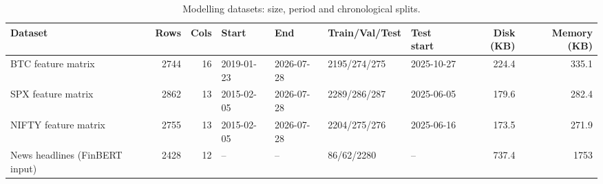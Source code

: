 \begin{table}[htbp]
\centering
\caption{Modelling datasets: size, period and chronological splits.}
\label{tab:t1_dataset_summary}
\begin{tabular}{lrrllllrr}
\toprule
Dataset & Rows & Cols & Start & End & Train/Val/Test & Test start & Disk (KB) & Memory (KB) \\
\midrule
BTC feature matrix & 2744 & 16 & 2019-01-23 & 2026-07-28 & 2195/274/275 & 2025-10-27 & 224.4 & 335.1 \\
SPX feature matrix & 2862 & 13 & 2015-02-05 & 2026-07-28 & 2289/286/287 & 2025-06-05 & 179.6 & 282.4 \\
NIFTY feature matrix & 2755 & 13 & 2015-02-05 & 2026-07-28 & 2204/275/276 & 2025-06-16 & 173.5 & 271.9 \\
News headlines (FinBERT input) & 2428 & 12 & -- & -- & 86/62/2280 & -- & 737.4 & 1753 \\
\bottomrule
\end{tabular}
\end{table}
